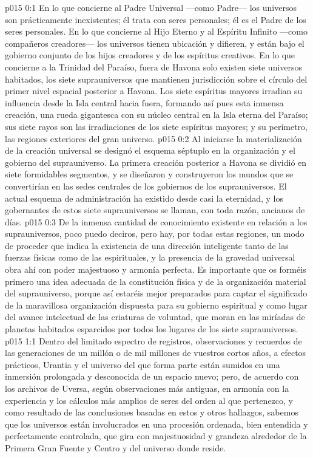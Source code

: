 \author{Censor universal}
\vs p015 0:1 En lo que concierne al Padre Universal ---como Padre--- los universos son prácticamente inexistentes; él trata con seres personales; él es el Padre de los seres personales. En lo que concierne al Hijo Eterno y al Espíritu Infinito ---como compañeros creadores--- los universos tienen ubicación y difieren, y están bajo el gobierno conjunto de los hijos creadores y de los espíritus creativos. En lo que concierne a la Trinidad del Paraíso, fuera de Havona solo existen siete universos habitados, los siete suprauniversos que mantienen jurisdicción sobre el círculo del primer nivel espacial posterior a Havona. Los siete espíritus mayores irradian su influencia desde la Isla central hacia fuera, formando así pues esta inmensa creación, una rueda gigantesca con su núcleo central en la Isla eterna del Paraíso; sus siete rayos son las irradiaciones de los siete espíritus mayores; y su perímetro, las regiones exteriores del gran universo.
\vs p015 0:2 Al iniciarse la materialización de la creación universal se designó el esquema séptuplo en la organización y el gobierno del suprauniverso. La primera creación posterior a Havona se dividió en siete formidables segmentos, y se diseñaron y construyeron los mundos que se convertirían en las sedes centrales de los gobiernos de los suprauniversos. El actual esquema de administración ha existido desde casi la eternidad, y los gobernantes de estos siete suprauniversos se llaman, con toda razón, ancianos de días.
\vs p015 0:3 De la inmensa cantidad de conocimiento existente en relación a los suprauniversos, poco puedo deciros, pero hay, por todas estas regiones, un modo de proceder que indica la existencia de una dirección inteligente tanto de las fuerzas físicas como de las espirituales, y la presencia de la gravedad universal obra ahí con poder majestuoso y armonía perfecta. Es importante que os forméis primero una idea adecuada de la constitución física y de la organización material del suprauniverso, porque así estaréis mejor preparados para captar el significado de la maravillosa organización dispuesta para su gobierno espiritual y como lugar del avance intelectual de las criaturas de voluntad, que moran en las miríadas de planetas habitados esparcidos por todos los lugares de los siete suprauniversos.
\vs p015 1:1 Dentro del limitado espectro de registros, observaciones y recuerdos de las generaciones de un millón o de mil millones de vuestros cortos años, a efectos prácticos, Urantia y el universo del que forma parte están sumidos en una inmersión prolongada y desconocida de un espacio nuevo; pero, de acuerdo con los archivos de Uversa, según observaciones más antiguas, en armonía con la experiencia y los cálculos más amplios de seres del orden al que pertenezco, y como resultado de las conclusiones basadas en estos y otros hallazgos, sabemos que los universos están involucrados en una procesión ordenada, bien entendida y perfectamente controlada, que gira con majestuosidad y grandeza alrededor de la Primera Gran Fuente y Centro y del universo donde reside.
